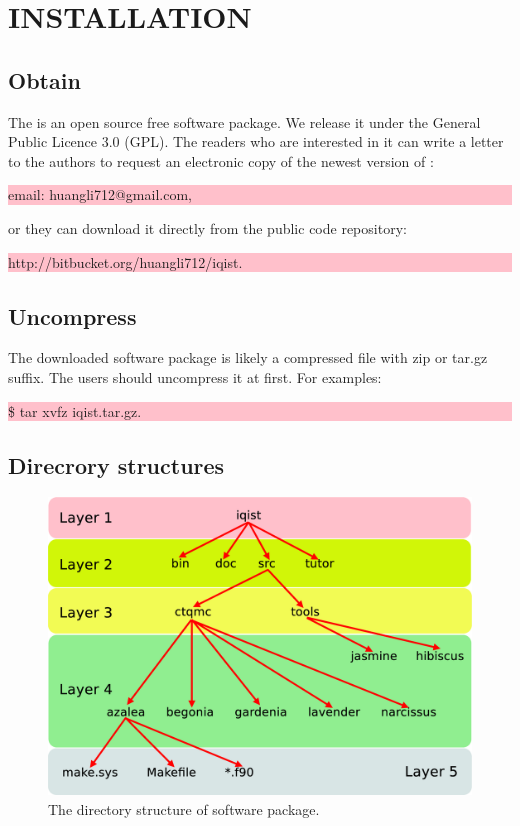 \chapter{INSTALLATION}
\section{Obtain}

The {\iqist} is an open source free software package. We release it under the General Public Licence 3.0 (GPL). The readers who are interested in it can write a letter to the authors to request an electronic copy of the newest version of {\iqist}:
 
\noindent\colorbox{pink}{\parbox[r]{\linewidth}{\quad email: huangli712@gmail.com,}}
or they can download it directly from the public code repository:

\noindent\colorbox{pink}{\parbox[r]{\linewidth}{\quad http://bitbucket.org/huangli712/iqist.}}

\section{Uncompress}

The downloaded {\iqist} software package is likely a compressed file with zip or tar.gz suffix. The users should uncompress it at first. For examples:

\noindent\colorbox{pink}{\parbox[r]{\linewidth}{\quad \$ tar xvfz iqist.tar.gz.}}

\section{Direcrory structures}

\begin{figure}[htpb]
\centering
\includegraphics[scale=0.28]{figure/dir.eps}
\caption{The directory structure of {\iqist} software package.\label{fig:dir}}
\end{figure}

